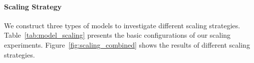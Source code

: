 \documentclass[]{bytedance_seed}
\newcommand{\todoq}[2][]{\todo[size=\scriptsize,color=orange!20!white,#1]{Quanquan: #2}}
\begin{document}

\paragraph{Scaling Strategy}
We construct three types of models to investigate different scaling strategies. Table~\ref{tab:model_scaling} presents the basic configurations of our scaling experiments. Figure~\ref{fig:scaling_combined} shows the results of different scaling strategies.
\end{document}
